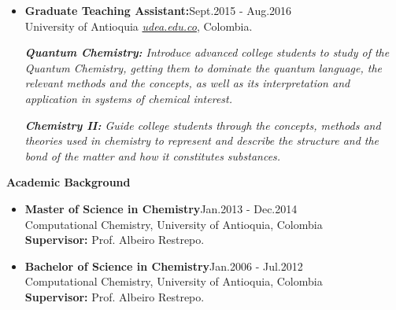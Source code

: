 \documentclass[12pt]{extarticle}
\begin{document}
\begin{itemize}

  \item {\bf Graduate Teaching Assistant:}\hfill \textcolor{azul}{Sept.2015 - Aug.2016}\\
  {University of Antioquia {\href{www.udea.edu.co}{\textcolor{azul}{\em udea.edu.co}}}, Colombia.}
  
  \emph{\textbf{Quantum Chemistry:} Introduce advanced college students to study of the Quantum Chemistry, getting them to dominate the quantum language, the relevant methods and the concepts, as well as its interpretation and application in systems of chemical interest.}
  
  \emph{\textbf{Chemistry II:} Guide college students through the concepts, methods and theories used in chemistry to represent and describe the structure and the bond of the matter and how it constitutes substances. }
% 
% 
%   
\end{itemize}


{\bf\Large Academic \textcolor{azul}{Background}}\\ \vspace*{-6mm}

\begin{itemize}
  \item {\bf Master of Science in Chemistry}\hfill \textcolor{azul}{Jan.2013 - Dec.2014}\\
  Computational Chemistry, University of Antioquia, Colombia\\
  {\bf Supervisor:} Prof. Albeiro Restrepo.
  
  \item {\bf Bachelor of Science in Chemistry}\hfill \textcolor{azul}{Jan.2006 - Jul.2012}\\
  Computational Chemistry, University of Antioquia, Colombia\\
  {\bf Supervisor:} Prof. Albeiro Restrepo.

\end{itemize}
\end{document}
